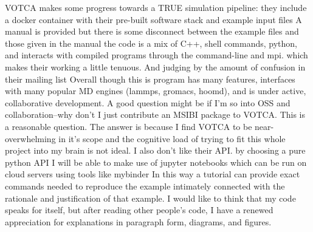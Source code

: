 VOTCA makes some progress towards a TRUE simulation pipeline: they include a docker container with their pre-built software stack and example input files %
A manual is provided but there is some disconnect between the example files and those given in the manual %
the code is a mix of C++, shell commands, python, and interacts with compiled programs through the command-line and mpi.
which makes their working a little tenuous.
And judging by the amount of confusion in their mailing list %
Overall though this is program has many features, interfaces with many popular MD engines (lammps, gromacs, hoomd), and is under active, collaborative development.
A good question might be if I'm so into OSS and collaboration--why don't I just contribute an MSIBI package to VOTCA.
This is a reasonable question.
The answer is because I find VOTCA to be near-overwhelming in it's scope and the cognitive load of trying to fit this whole project into my brain is not ideal.
I also don't like their API.
by choosing a pure python API I will be able to make use of jupyter notebooks which can be run on cloud servers using tools like mybinder %
In this way a tutorial can provide exact commands needed to reproduce the example intimately connected with the rationale and justification of that example.
I would like to think that my code speaks for itself, but after reading other people's code, I have a renewed appreciation for explanations in paragraph form, diagrams, and figures.

